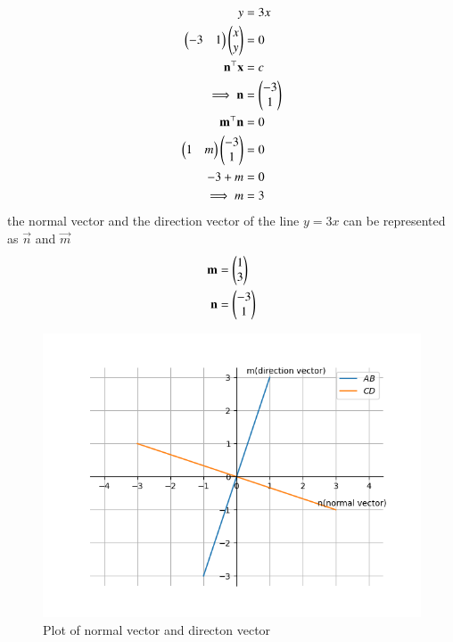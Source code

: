 \documentclass[journal]{IEEEtran}
\begin{document}
\solution \\
\begin{align}
	y&=3x\\
	\begin{pmatrix}-3 & 1\end{pmatrix}\begin{pmatrix}x\\y\end{pmatrix}&=0\\
	\mathbf{n}^\top \mathbf{x} &=c\\
	\implies \mathbf{n}&=\begin{pmatrix}-3\\ 1\end{pmatrix}\\
	\mathbf{m}^\top \mathbf{n} &= 0\\
	\begin{pmatrix}1 & m\end{pmatrix}\begin{pmatrix}-3 \\ 1\end{pmatrix}&=0\\
	-3+m &=0\\
	\implies m &= 3
\end{align}
the normal vector and the direction vector of the line $y=3x$ can be represented as $\vec{n}$ and $\vec{m}$\\
\begin{align}
	\mathbf{m} &= \begin{pmatrix}1\\3\end{pmatrix}\\
	\mathbf{n} &= \begin{pmatrix}-3\\1\end{pmatrix}
\end{align}
\begin{figure}[h!]
                \centering
               \includegraphics[width=0.7\linewidth]{Figs/Fig1.png}
			\caption{Plot of normal vector and directon vector}
               \label{stemplot}
               \end{figure}
\end{document}
